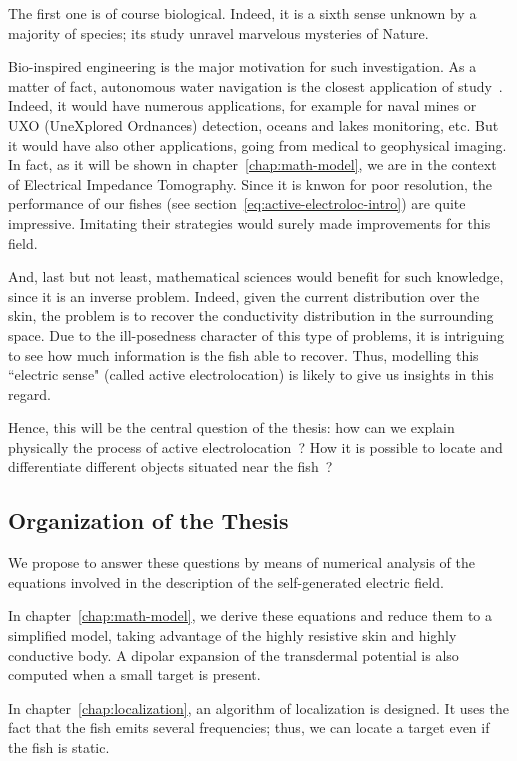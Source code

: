 The first one is of course biological. Indeed, it is a sixth sense unknown by
a majority of species; its study unravel marvelous mysteries of Nature.

Bio-inspired engineering is the major motivation for such investigation. As a matter
of fact, autonomous water navigation is the closest application of study~\cite{boyer}.
Indeed, it would have numerous applications, for example for naval mines or UXO
(UneXplored Ordnances) detection, oceans and lakes monitoring, etc. But it would have
also other applications, going from medical to geophysical imaging. In fact, as it will be shown
in chapter~\ref{chap:math-model}, we are in the context of Electrical Impedance Tomography.
Since it is knwon for poor resolution, the performance of our fishes (see section~\ref{eq:active-electroloc-intro})
are quite impressive. Imitating their strategies would surely made improvements
for this field. 

And, last but not least, mathematical sciences would benefit for such
knowledge, since it is an inverse problem.
Indeed, given the current distribution
over the skin, the problem is to recover the conductivity distribution
in the surrounding space. Due to the ill-posedness character of this
type of problems, it is intriguing to see how much information is
the fish able to recover. Thus, modelling this ``electric
sense" (called active electrolocation) is likely to give us insights
in this regard.

Hence, this will be the central question of the thesis: how can we explain
physically the process of active electrolocation~? How it is possible to
locate and differentiate different objects situated near the fish~? 

\subsection{Organization of the Thesis}

We propose to answer these questions by means of numerical analysis of the
equations involved in the description of the self-generated electric field.

In chapter~\ref{chap:math-model}, we derive these equations and reduce them
to a simplified model, taking advantage of the highly resistive skin and
highly conductive body. A dipolar expansion of the transdermal potential
is also computed when a small target is present.

In chapter~\ref{chap:localization}, an algorithm of localization is designed.
It uses the fact that the fish emits several frequencies; thus, we can locate
a target even if the fish is static.


